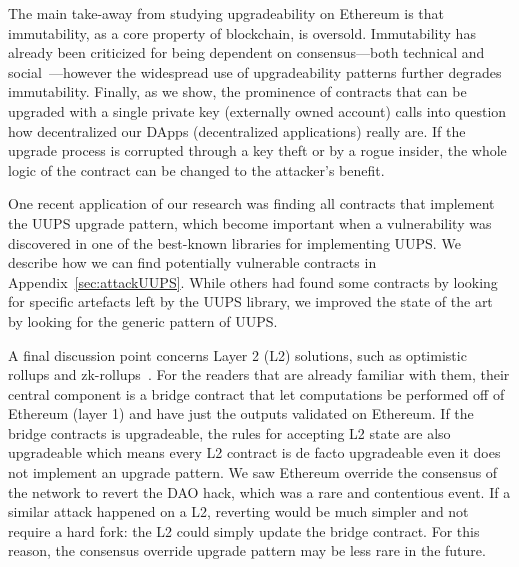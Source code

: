 
The main take-away from studying upgradeability on Ethereum is that immutability, as a core property of blockchain, is oversold. Immutability has already been criticized for being dependent on consensus---both technical and social~\cite{walch2016path}---however the widespread use of upgradeability patterns further degrades immutability. Finally, as we show, the prominence of contracts that can be upgraded with a single private key (\ie externally owned account) calls into question how decentralized our DApps (decentralized applications) really are. If the upgrade process is corrupted through a key theft or by a rogue insider, the whole logic of the contract can be changed to the attacker's benefit. 

One recent application of our research was finding all contracts that implement the UUPS upgrade pattern, which become important when a vulnerability was discovered in one of the best-known libraries for implementing UUPS. We describe how we can find potentially vulnerable contracts in Appendix~\ref{sec:attackUUPS}. While others had found some contracts by looking for specific artefacts left by the UUPS library, we improved the state of the art by looking for the generic pattern of UUPS. 

A final discussion point concerns Layer 2 (L2) solutions, such as optimistic rollups and zk-rollups~\cite{mccorry2021sok}. For the readers that are already familiar with them, their central component is a bridge contract that let computations be performed off of Ethereum (layer 1) and have just the outputs validated on Ethereum. If the bridge contracts is upgradeable, the rules for accepting L2 state are also upgradeable which means every L2 contract is de facto upgradeable even it does not implement an upgrade pattern. We saw Ethereum override the consensus of the network to revert the DAO hack, which was a rare and contentious event. If a similar attack happened on a L2, reverting would be much simpler and not require a hard fork: the L2 could simply update the bridge contract. For this reason, the consensus override upgrade pattern may be less rare in the future. 


